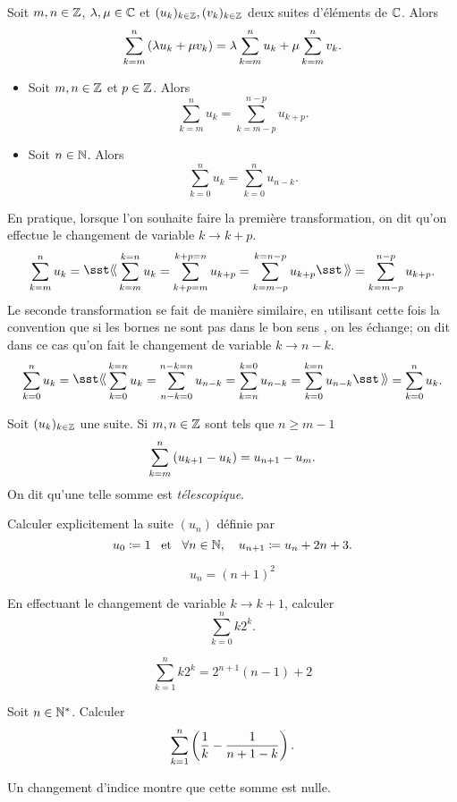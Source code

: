 \documentclass{magnolia}
\begin{document}
\begin{proposition}
Soit $m,n\in\mathbb{Z}$, $\lambda,\mu\in\mathbb{C}$ et $(u_k)_{k\in\mathbb{Z}}, (v_k)_{k\in\mathbb{Z}}$ deux suites d'éléments de $\mathbb{C}$. Alors
\[\sum_{k=m}^n \left(\lambda u_k+\mu v_k\right)=\lambda\sum_{k=m}^n u_k + \mu\sum_{k=m}^n v_k.\]
\end{proposition}

\begin{proposition}[utile=-3]
\begin{itemize}
\item Soit $m,n\in\mathbb{Z}$ et $p\in\mathbb{Z}$. Alors
  \[\sum_{k=m}^n u_k=\sum_{k=m-p}^{n-p} u_{k+p}.\]
\item Soit $n\in\mathbb{N}$. Alors
  \[\sum_{k=0}^n u_k=\sum_{k=0}^n u_{n-k}.\]
\end{itemize}
\end{proposition}

\begin{remarqueUnique}
\remarque En pratique, lorsque l'on souhaite faire la première transformation,
  on dit qu'on effectue le changement de variable $k\to k+p$.
  \[\sum_{k=m}^n u_k=\text{\og} \sum_{k=m}^{k=n} u_k=\sum_{k+p=m}^{k+p=n} u_{k+p}=
    \sum_{k=m-p}^{k=n-p} u_{k+p}\text{\fg}=\sum_{k=m-p}^{n-p} u_{k+p}.\]
  Le seconde transformation se fait de manière similaire, en utilisant cette fois la
  convention que si les bornes ne sont pas \og dans le bon sens \fg, on les échange; on
  dit dans ce cas qu'on fait le changement de variable $k\to n-k$.
  \[\sum_{k=0}^n u_k=\text{\og} \sum_{k=0}^{k=n} u_k=\sum_{n-k=0}^{n-k=n} u_{n-k}=
  \sum_{k=n}^{k=0} u_{n-k}=\sum_{k=0}^{k=n} u_{n-k}\text{\fg}=\sum_{k=0}^{n} u_{k}.\]

\remarque Soit $(u_k)_{k\in\mathbb{Z}}$ une suite. Si $m,n\in\mathbb{Z}$ sont tels que $n\geq m-1$
  \[\sum_{k=m}^n \left(u_{k+1} - u_k\right) = u_{n+1}-u_m.\]
  On dit qu'une telle somme est \emph{télescopique}.
\end{remarqueUnique}

\begin{exos}
\exo Calculer explicitement la suite $(u_n)$ définie par
  \[u_0\coloneqq 1 \quad\!\text{et}\quad\! \forall n\in\mathbb{N},\quad u_{n+1}\coloneqq u_n+2n+3.\]
  \begin{sol}
\[u_n=(n+1)^2\]
  \end{sol}
\exo En effectuant le changement de variable $k\to k+1$, calculer
  \[\sum_{k=0}^n k 2^k.\]
 \begin{sol}
\[\sum_{k=1}^n k 2^k=2^{n+1}(n-1)+2\]
 \end{sol}
\exo Soit $n\in{\mathbb{N}^*}$. Calculer
  \[\sum_{k=1}^n \left(\frac 1k - \frac 1{n+1-k}\right).\]
  \begin{sol}
Un changement d'indice montre que cette somme est nulle.
  \end{sol}
\end{exos}
\end{document}
